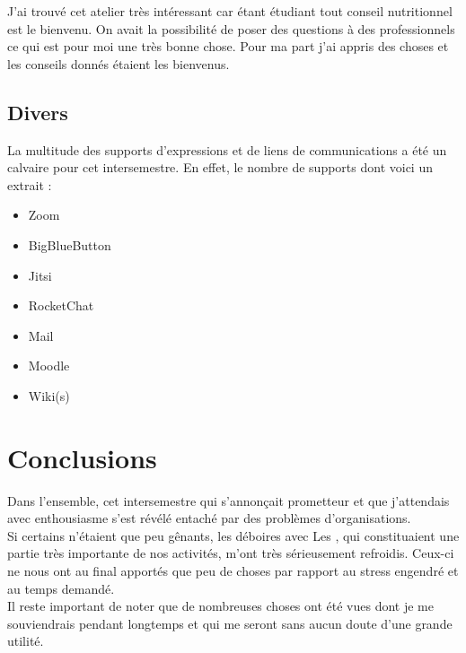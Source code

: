 J'ai trouvé cet atelier très intéressant car étant étudiant tout conseil nutritionnel est le bienvenu. On avait la possibilité de poser des questions à des professionnels ce qui est pour moi une très bonne chose. Pour ma part j'ai appris des choses et les conseils donnés étaient les bienvenus.

\newpage
\section{Divers}

La multitude des supports d'expressions et de liens de communications a été un calvaire pour cet intersemestre. En effet, le nombre de supports dont voici un extrait : 

\begin{itemize}
    \item Zoom
    \item BigBlueButton
    \item Jitsi
    \item RocketChat
    \item Mail
    \item Moodle
    \item Wiki(s)
\end{itemize}


\chapter{Conclusions}

Dans l'ensemble, cet intersemestre  qui s'annonçait prometteur et que j'attendais avec enthousiasme s'est révélé entaché par des problèmes d'organisations.\\

Si certains n'étaient que peu gênants, les déboires avec Les \pd, qui constituaient une partie très importante de nos activités, m'ont très sérieusement refroidis. Ceux-ci ne nous ont au final apportés que peu de choses par rapport au stress engendré et au temps demandé.\\

Il reste important de noter que de nombreuses choses ont été vues dont je me souviendrais pendant longtemps et qui me seront sans aucun doute d'une grande utilité.